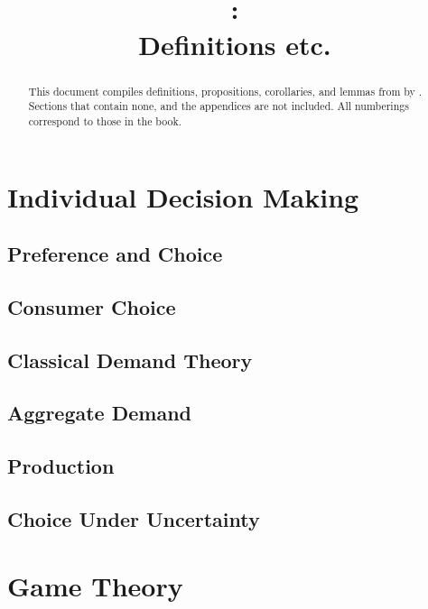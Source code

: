 \documentclass{report} %
\title{\citetitle{mas1995microeconomic}\\\parencite{mas1995microeconomic}:\\Definitions etc.}
\author{}
\date{}
\theoremstyle{definition}
\begin{document}
\maketitle

\renewcommand{\abstractname}{Preface}
\begin{abstract}
	This document compiles definitions, propositions, corollaries, and lemmas from  by \cite{mas1995microeconomic}.
	Sections that contain none, and the appendices are not included.
	All numberings correspond to those in the book.
\end{abstract}

\tableofcontents

\part{Individual Decision Making}

\chapter{Preference and Choice}


\chapter{Consumer Choice}


\chapter{Classical Demand Theory}


\chapter{Aggregate Demand}


\chapter{Production}


\chapter{Choice Under Uncertainty}



\part{Game Theory}
\end{document}

